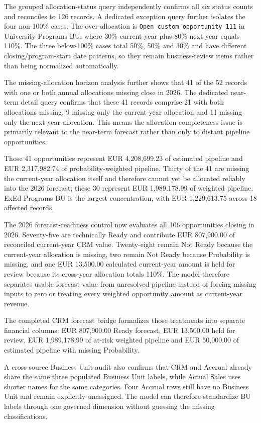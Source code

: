 \documentclass[11pt,a4paper]{article}
\begin{document}
\begin{summarybox}
The grouped allocation-status query independently confirms all six status counts
and reconciles to 126 records. A dedicated exception query further isolates the
four non-100\% cases. The over-allocation is \texttt{Open custom opportunity 111}
in University Programs BU, where 30\% current-year plus 80\% next-year equals
110\%. The three below-100\% cases total 50\%, 50\% and 30\% and have different
closing/program-start date patterns, so they remain business-review items rather
than being normalized automatically.

The missing-allocation horizon analysis further shows that 41 of the 52 records
with one or both annual allocations missing close in 2026. The dedicated
near-term detail query confirms that these 41 records comprise 21 with both
allocations missing, 9 missing only the current-year allocation and 11 missing
only the next-year allocation. This means the allocation-completeness issue is
primarily relevant to the near-term forecast rather than only to distant
pipeline opportunities.

Those 41 opportunities represent EUR 4,208,699.23 of estimated pipeline and
EUR 2,317,982.74 of probability-weighted pipeline. Thirty of the 41 are missing
the current-year allocation itself and therefore cannot yet be allocated
reliably into the 2026 forecast; these 30 represent EUR 1,989,178.99 of
weighted pipeline. ExEd Programs BU is the largest concentration, with
EUR 1,229,613.75 across 18 affected records.

The 2026 forecast-readiness control now evaluates all 106 opportunities closing
in 2026. Seventy-five are technically Ready and contribute EUR 807,900.00 of
reconciled current-year CRM value. Twenty-eight remain Not Ready because the
current-year allocation is missing, two remain Not Ready because Probability is
missing, and one EUR 13,500.00 calculated current-year amount is held for review
because its cross-year allocation totals 110\%. The model therefore separates
usable forecast value from unresolved pipeline instead of forcing missing inputs
to zero or treating every weighted opportunity amount as current-year revenue.

The completed CRM forecast bridge formalizes those treatments into separate
financial columns: EUR 807,900.00 Ready forecast, EUR 13,500.00 held for review,
EUR 1,989,178.99 of at-risk weighted pipeline and EUR 50,000.00 of estimated
pipeline with missing Probability.

A cross-source Business Unit audit also confirms that CRM and Accrual already
share the same three populated Business Unit labels, while Actual Sales uses
shorter names for the same categories. Four Accrual rows still have no Business
Unit and remain explicitly unassigned. The model can therefore standardize BU
labels through one governed dimension without guessing the missing classifications.


\end{summarybox}
\end{document}
